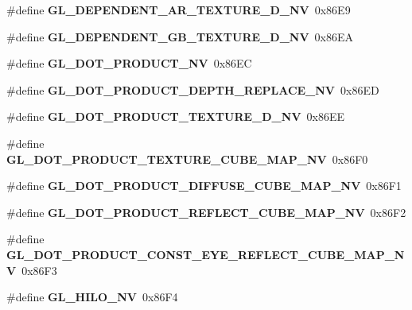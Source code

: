 \begin{DoxyCompactItemize}
\item 
\#define {\bfseries G\+L\+\_\+\+D\+E\+P\+E\+N\+D\+E\+N\+T\+\_\+\+A\+R\+\_\+\+T\+E\+X\+T\+U\+R\+E\+\_\+D\+\_\+\+N\+V}~0x86\+E9\label{_s_d_l__opengl_8h_a4ee6c310195270edf473cd33480554d3}

\item 
\#define {\bfseries G\+L\+\_\+\+D\+E\+P\+E\+N\+D\+E\+N\+T\+\_\+\+G\+B\+\_\+\+T\+E\+X\+T\+U\+R\+E\+\_\+D\+\_\+\+N\+V}~0x86\+E\+A\label{_s_d_l__opengl_8h_a3a42ad63d1b163b3e6690010163bb243}

\item 
\#define {\bfseries G\+L\+\_\+\+D\+O\+T\+\_\+\+P\+R\+O\+D\+U\+C\+T\+\_\+\+N\+V}~0x86\+E\+C\label{_s_d_l__opengl_8h_a08be6f36d1b4bba5253fd5236c377fba}

\item 
\#define {\bfseries G\+L\+\_\+\+D\+O\+T\+\_\+\+P\+R\+O\+D\+U\+C\+T\+\_\+\+D\+E\+P\+T\+H\+\_\+\+R\+E\+P\+L\+A\+C\+E\+\_\+\+N\+V}~0x86\+E\+D\label{_s_d_l__opengl_8h_a01534ab6e3994a4516559377f663f565}

\item 
\#define {\bfseries G\+L\+\_\+\+D\+O\+T\+\_\+\+P\+R\+O\+D\+U\+C\+T\+\_\+\+T\+E\+X\+T\+U\+R\+E\+\_\+D\+\_\+\+N\+V}~0x86\+E\+E\label{_s_d_l__opengl_8h_abb27a9eecefc045345a3a2cf0b93210c}

\item 
\#define {\bfseries G\+L\+\_\+\+D\+O\+T\+\_\+\+P\+R\+O\+D\+U\+C\+T\+\_\+\+T\+E\+X\+T\+U\+R\+E\+\_\+\+C\+U\+B\+E\+\_\+\+M\+A\+P\+\_\+\+N\+V}~0x86\+F0\label{_s_d_l__opengl_8h_a57db977a82f592520cffd31f06e86964}

\item 
\#define {\bfseries G\+L\+\_\+\+D\+O\+T\+\_\+\+P\+R\+O\+D\+U\+C\+T\+\_\+\+D\+I\+F\+F\+U\+S\+E\+\_\+\+C\+U\+B\+E\+\_\+\+M\+A\+P\+\_\+\+N\+V}~0x86\+F1\label{_s_d_l__opengl_8h_ae735f0271ead87b4bedba9e318192096}

\item 
\#define {\bfseries G\+L\+\_\+\+D\+O\+T\+\_\+\+P\+R\+O\+D\+U\+C\+T\+\_\+\+R\+E\+F\+L\+E\+C\+T\+\_\+\+C\+U\+B\+E\+\_\+\+M\+A\+P\+\_\+\+N\+V}~0x86\+F2\label{_s_d_l__opengl_8h_a32601e9ec6df5b209723f8359f8a16c9}

\item 
\#define {\bfseries G\+L\+\_\+\+D\+O\+T\+\_\+\+P\+R\+O\+D\+U\+C\+T\+\_\+\+C\+O\+N\+S\+T\+\_\+\+E\+Y\+E\+\_\+\+R\+E\+F\+L\+E\+C\+T\+\_\+\+C\+U\+B\+E\+\_\+\+M\+A\+P\+\_\+\+N\+V}~0x86\+F3\label{_s_d_l__opengl_8h_aa687825e7e9933664508e2d2199b1c16}

\item 
\#define {\bfseries G\+L\+\_\+\+H\+I\+L\+O\+\_\+\+N\+V}~0x86\+F4\label{_s_d_l__opengl_8h_ab710285d98f4aa7c4d2e4dcf8a270653}


\end{DoxyCompactItemize}
